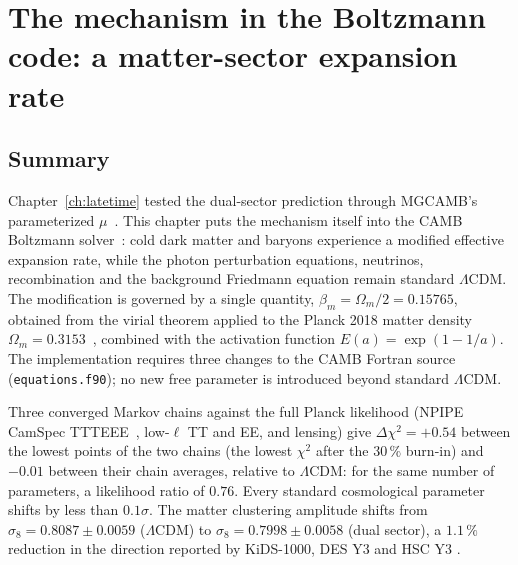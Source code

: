 
\chapter{The mechanism in the Boltzmann code: a matter-sector expansion rate}\label{ch:level2}

\section*{Summary}
Chapter~\ref{ch:latetime} tested the dual-sector prediction through MGCAMB's parameterized $\mu$~\cite{Zhao2009MGCAMB,Wang2023MGCAMB}. This chapter
puts the mechanism itself into the CAMB Boltzmann solver~\cite{Lewis2000CAMB}: cold dark matter and baryons experience a modified effective
expansion rate, while the photon perturbation equations, neutrinos, recombination and the background Friedmann equation remain standard
$\Lambda$CDM. The modification is governed by a single quantity, $\beta_m=\Omega_m/2=0.15765$, obtained from the virial theorem applied to the Planck
2018 matter density $\Omega_m=0.3153$~\cite{Planck2018VI}, combined with the activation function $E(a)=\exp(1-1/a)$. The implementation requires
three changes to the CAMB Fortran source (\texttt{equations.f90}); no new free parameter is introduced beyond standard $\Lambda$CDM.

Three converged Markov chains against the full Planck likelihood (NPIPE CamSpec TTTEEE~\cite{Rosenberg2022}, low-$\ell$ TT and EE, and lensing) give
$\Delta\chi^2=+0.54$ between the lowest points of the two chains (the lowest $\chi^2$ after the $30\,\%$ burn-in) and $-0.01$ between their chain averages, relative to $\Lambda$CDM: for the same number
of parameters, a likelihood ratio of $0.76$. Every standard cosmological parameter shifts by less than $0.1\sigma$. The matter clustering amplitude
shifts from $\sigma_8=0.8087\pm0.0059$ ($\Lambda$CDM) to $\sigma_8=0.7998\pm0.0058$ (dual sector), a $1.1\,\%$ reduction in the direction reported by
KiDS-1000, DES Y3 and HSC Y3 \measured.

